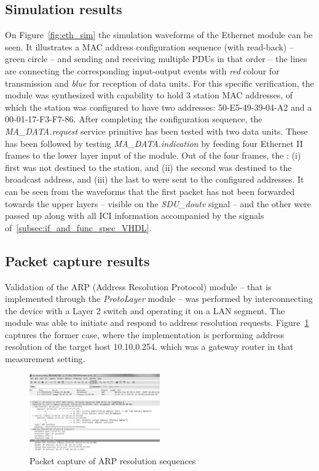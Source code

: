 \documentclass[conference]{IEEEtran}
\begin{document}
\subsection{Simulation results}

On Figure~\ref{fig:eth_sim} the simulation waveforms of the Ethernet module can be seen. It illustrates a MAC address
configuration sequence (with read-back) -- green circle -- and sending and receiving multiple PDUs in that order -- the
lines are connecting the corresponding input-output events with \emph{red} colour for transmission and \emph{blue} for
reception of data units. For this specific verification, the module was synthesized with capability to hold 3 station
MAC addresses, of which the station was configured to have two addresses: 50-E5-49-39-04-A2 and a 00-01-17-F3-F7-86.
After completing the configuration sequence, the \emph{MA\_DATA.request} service primitive has been tested with two
data units. These has been followed by testing \emph{MA\_DATA.indication} by feeding four Ethernet II frames to the
lower layer input of the module. Out of the four frames, the : (i) first was not destined to the station, and (ii)
the second was destined to the broadcast address, and  (iii) the last to were sent to the configured addresses.
It can be seen from the waveforms that the first packet has not been forwarded towards the upper layers -- visible on
the \emph{SDU\_doutv} signal -- and the other were passed up along with all ICI information accompanied by the signals of~\ref{subsec:if_and_func_spec_VHDL}.

\subsection{Packet capture results}

Validation of the ARP (Address Resolution Protocol) module -- that is implemented through the \emph{ProtoLayer} module
-- was performed by interconnecting the device with a Layer 2 switch and operating it on a LAN segment. The module was
able to initiate and respond to address resolution requests. Figure~\ref{fig:pcap_arp_seq} captures the former case,
where the implementation is performing address resolution of the target host 10.10.0.254. which was a gateway router in
that measurement setting.

\begin{figure}[!htb]
    \centering
    \includegraphics[width=0.5\textwidth]{figures_raw/arp_transaction.png}
    \caption{Packet capture of ARP resolution sequences}
    \label{fig:pcap_arp_seq}
\end{figure}
\end{document}
